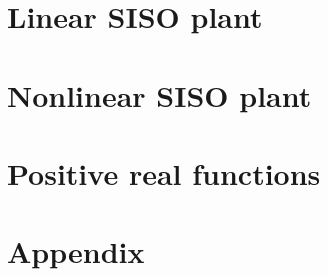 \section{Linear SISO plant}


\section{Nonlinear SISO plant}


\section{Positive real functions}


\vfill
\section{Appendix}



